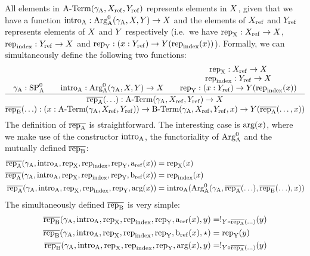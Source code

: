 \documentclass{article}
\begin{document}
All elements in $\Aterm(\gammaA,\Xref, \Yref)$ represents elements in
$\A$, given that we have a function $\introA : \ArgAp(\gammaA, \A, \B) \to
\A$ and the elements of $\Xref$ and $\Yref$ represents elements of $\A$
and $\B$ respectively (i.e.\ we have $\repA : \Xref \to \A$, $\repIndex
: \Yref \to \A$ and $\repB : (x : \Yref) \to \B(\repIndex(x))$).
Formally, we can simultaneously define the following two functions:
%
\[ %
\infer{\deduce{\repBbar(\ldots) : (x : \Aterm(\gammaA, \Xref, \Yref)) \to \Bterm(\gammaA, \Xref, \Yref, x) \to \B(\repAbar(\ldots, x))}
              {\repAbar(\ldots) : \Aterm(\gammaA, \Xref, \Yref) \to \A}}
      {\gammaA : \SPAp & \quad
       \introA : \ArgAp(\gammaA, \A, \B) \to \A & \quad
       \deduce{\repB : (x : \Yref) \to \B(\repIndex(x))}
              {\deduce{\repIndex : \Yref \to \A}
                      {\repA : \Xref \to \A}}}
\]
%
The definition of $\repAbar$ is straightforward. The interesting case
is $\termArg(x)$, where we make use of the constructor $\introA$, the
functoriality of $\ArgAp$ and the mutually defined $\repBbar$:
\begin{align*}
  \repAbar(\gammaA, \introA, \repA, \repIndex, \repB, \termAref(x)) &= \repA(x) \\
  \repAbar(\gammaA, \introA, \repA, \repIndex, \repB, \termBref(x)) &= \repIndex(x) \\
  \repAbar(\gammaA, \introA, \repA, \repIndex, \repB, \termArg(x)) 
    &= \introA(\ArgAp(\gammaA, \repAbar(\ldots), \repBbar(\ldots), x))
\end{align*}
%
The simultaneously defined $\repBbar$ is very simple:
%
\begin{align*}
  \repBbar(\gammaA, \introA, \repA, \repIndex, \repB, \termAref(x), y) &= \magic{\B \circ \repAbar(\ldots)}(y) \\
\repBbar(\gammaA, \introA, \repA, \repIndex, \repB, \termBref(x), \oneelt) &= \repB(y) \\
\repBbar(\gammaA, \introA, \repA, \repIndex, \repB, \termArg(x), y) &= \magic{\B \circ \repAbar(\ldots)}(y) \\ \\
\end{align*}
\end{document}
